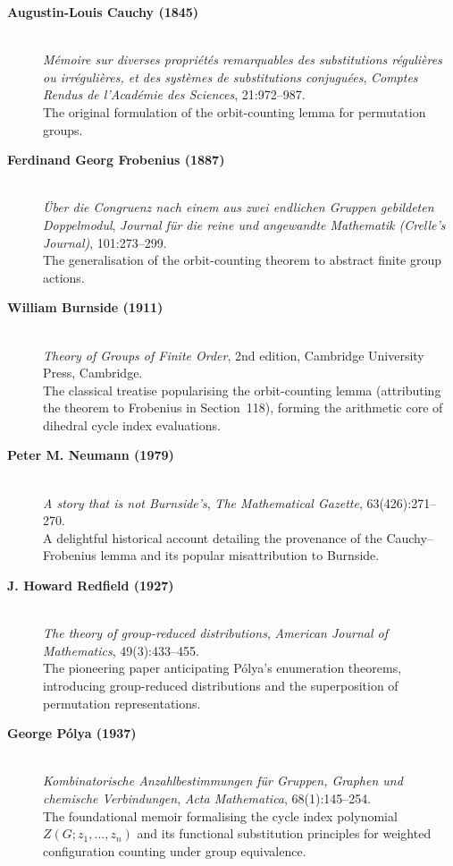 \begin{description}
    \item[\textbf{Augustin-Louis Cauchy (1845)}]\mbox{}\\
    \emph{M\'emoire sur diverses propri\'et\'es remarquables des substitutions r\'eguli\`eres ou irr\'eguli\`eres, et des syst\`emes de substitutions conjugu\'ees}, \emph{Comptes Rendus de l'Acad\'emie des Sciences}, 21:972--987.\\
    The original formulation of the orbit-counting lemma for permutation groups.

    \item[\textbf{Ferdinand Georg Frobenius (1887)}]\mbox{}\\
    \emph{\"Uber die Congruenz nach einem aus zwei endlichen Gruppen gebildeten Doppelmodul}, \emph{Journal f\"ur die reine und angewandte Mathematik (Crelle's Journal)}, 101:273--299.\\
    The generalisation of the orbit-counting theorem to abstract finite group actions.

    \item[\textbf{William Burnside (1911)}]\mbox{}\\
    \emph{Theory of Groups of Finite Order}, 2nd edition, Cambridge University Press, Cambridge.\\
    The classical treatise popularising the orbit-counting lemma (attributing the theorem to Frobenius in Section~118), forming the arithmetic core of dihedral cycle index evaluations.

    \item[\textbf{Peter M. Neumann (1979)}]\mbox{}\\
    \emph{A story that is not Burnside's}, \emph{The Mathematical Gazette}, 63(426):271--270.\\
    A delightful historical account detailing the provenance of the Cauchy--Frobenius lemma and its popular misattribution to Burnside.

    \item[\textbf{J. Howard Redfield (1927)}]\mbox{}\\
    \emph{The theory of group-reduced distributions}, \emph{American Journal of Mathematics}, 49(3):433--455.\\
    The pioneering paper anticipating P\'olya's enumeration theorems, introducing group-reduced distributions and the superposition of permutation representations.

    \item[\textbf{George P\'olya (1937)}]\mbox{}\\
    \emph{Kombinatorische Anzahlbestimmungen f\"ur Gruppen, Graphen und chemische Verbindungen}, \emph{Acta Mathematica}, 68(1):145--254.\\
    The foundational memoir formalising the cycle index polynomial $Z(G; z_1, \dots, z_n)$ and its functional substitution principles for weighted configuration counting under group equivalence.


\end{description}
